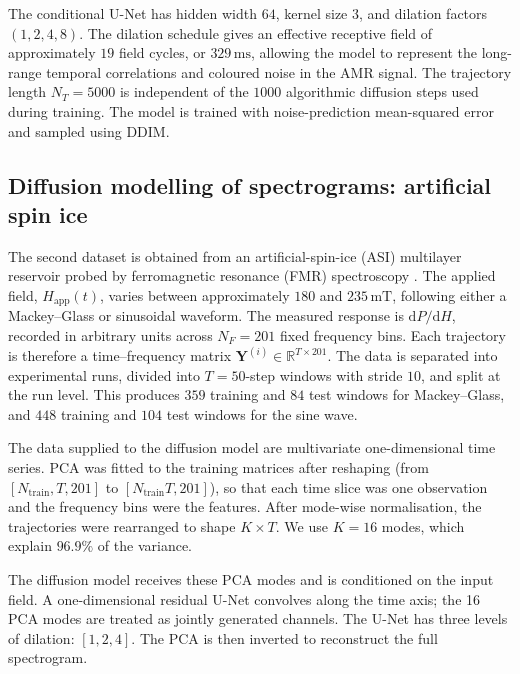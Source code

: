 The conditional U-Net has hidden width $64$, kernel size $3$, and dilation factors $(1,2,4,8)$. The dilation schedule gives an effective receptive field of approximately $19$ field cycles, or $329\,\mathrm{ms}$, allowing the model to represent the long-range temporal correlations and coloured noise in the AMR signal. The trajectory length $N_T=5000$ is independent of the $1000$ algorithmic diffusion steps used during training.  The model is trained with noise-prediction mean-squared error and sampled using DDIM.

\subsection{Diffusion modelling of spectrograms: artificial spin ice}\label{ssec:asi}

The second dataset is obtained from an artificial-spin-ice (ASI) multilayer reservoir probed by ferromagnetic resonance (FMR) spectroscopy \cite{stenning2024neuromorphic}. The applied field, $H_{\mathrm{app}}(t)$, varies between approximately $180$ and $235\,\mathrm{mT}$, following either a Mackey--Glass or sinusoidal waveform. The measured response is $\mathrm{d}P/\mathrm{d}H$, recorded in arbitrary units across $N_F=201$ fixed frequency bins. Each trajectory is therefore a time--frequency matrix $\mathbf{Y}^{(i)}\in\mathbb{R}^{T\times201}$. The data is separated into experimental runs, divided into $T=50$-step windows with stride $10$, and split at the run level. This produces $359$ training and $84$ test windows for Mackey--Glass, and $448$ training and $104$ test windows for the sine wave. 

The data supplied to the diffusion model are multivariate one-dimensional time series. PCA was fitted to the training matrices after reshaping (from $[N_{\mathrm{train}},T,201]$ to $[N_{\mathrm{train}}T,201]$), so that each time slice was one observation and the frequency bins were the features. After mode-wise normalisation, the trajectories were rearranged to shape $K\times T$. We use $K=16$ modes, which explain $96.9\%$ of the variance.

The diffusion model receives these PCA modes and is conditioned on the input field. A one-dimensional residual U-Net convolves along the time axis; the 16 PCA modes are treated as jointly generated channels. The U-Net has three levels of dilation: $[1,2,4]$. The PCA is then inverted to reconstruct the full spectrogram.

